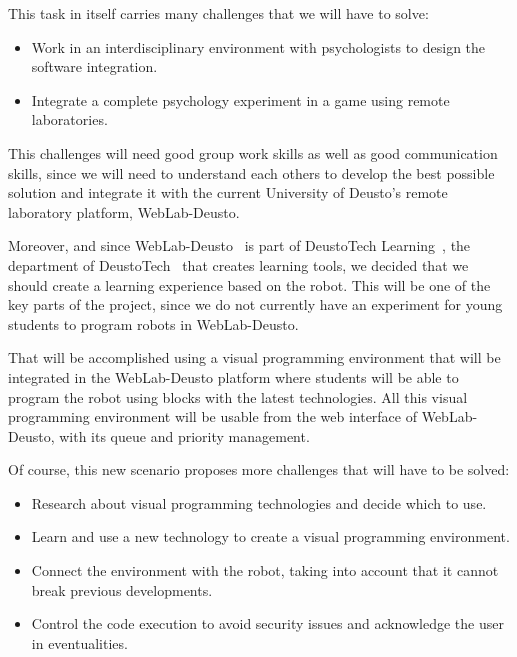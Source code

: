 This task in itself carries many challenges that we will have to solve:

\begin{itemize}

\item Work in an interdisciplinary environment with psychologists to design the software
integration.

\item Integrate a complete psychology experiment in a game using remote laboratories.

\end{itemize}

This challenges will need good group work skills as well as good communication skills, since we will
need to understand each others to develop the best possible solution and integrate it with the
current University of Deusto's remote laboratory platform, WebLab-Deusto.

Moreover, and since WebLab-Deusto~\cite{weblab_web} is part of DeustoTech
Learning~\cite{dtlearning_web}, the department of DeustoTech~\cite{deustotech_web} that creates
learning tools, we decided that we should create a learning experience based on the robot. This will
be one of the key parts of the project, since we do not currently have an experiment for young
students to program robots in WebLab-Deusto.

That will be accomplished using a visual programming environment that will be integrated in the
WebLab-Deusto platform where students will be able to program the robot using blocks with the latest
technologies. All this visual programming environment will be usable from the web interface of
WebLab-Deusto, with its queue and priority management.

Of course, this new scenario proposes more challenges that will have to be solved:

\begin{itemize}

\item Research about visual programming technologies and decide which to use.

\item Learn and use a new technology to create a visual programming environment.

\item Connect the environment with the robot, taking into account that it cannot break previous
developments.

\item Control the code execution to avoid security issues and acknowledge the user in eventualities.

\end{itemize}

